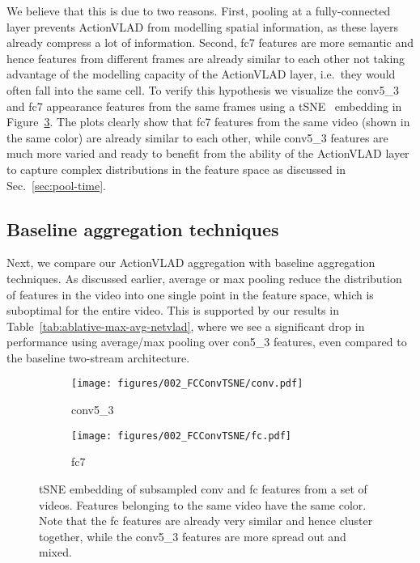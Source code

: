 \documentclass[10pt,twocolumn,letterpaper]{article}
\newcommand{\methodTag}[0]{ActionVLAD}
\begin{document}
We believe that this is due to two reasons. First, pooling
at a fully-connected layer prevents \methodTag{} 
from modelling spatial information, as these layers
already compress a lot of information.
Second, fc7 features are more semantic and hence features from different frames are already  similar to each other not taking advantage 
of the modelling capacity of the  \methodTag{} layer, i.e.\ they would often fall into the same cell.
To verify this hypothesis we visualize the conv5\_3 and fc7 appearance features from the same frames using a tSNE~\cite{tsne} embedding in Figure~\ref{fig:tsne_fc_conv5}.
The plots clearly show that fc7 features from the same video (shown in the same color) are already
similar to each other, while conv5\_3 features are much more varied and ready to benefit from the ability of the \methodTag{} layer to capture complex distributions in the feature space as discussed in Sec.~\ref{sec:pool-time}. 



\subsection{Baseline aggregation techniques}\label{sec:expts:whichAgg}

Next, we compare our ActionVLAD aggregation with baseline aggregation techniques. As discussed earlier, average or max pooling reduce the distribution of features in the video into one single point in the feature space, which is suboptimal for the entire video.  This is supported by our results in Table~\ref{tab:ablative-max-avg-netvlad}, where we see a significant drop in performance using average/max pooling over con5\_3 features, even compared to the baseline two-stream architecture.


\begin{figure}
    \centering
    \begin{subfigure}{0.49\linewidth} \centering
     \texttt{[image: figures/002\_FCConvTSNE/conv.pdf]}
     \caption*{conv5\_3}\label{fig:rgbflow:concat}
   \end{subfigure}\hfill
   \begin{subfigure}{0.49\linewidth} \centering
     \texttt{[image: figures/002\_FCConvTSNE/fc.pdf]}
     \caption*{fc7}\label{fig:rgbflow:concat}
   \end{subfigure}
       \caption{tSNE embedding of subsampled conv and fc features from a set of videos.
    Features belonging to the same video have the same color.
        Note that the fc features are already very similar and hence cluster together,
    while the conv5\_3 features are more spread out and mixed.}
    \label{fig:tsne_fc_conv5}
\end{figure}
\end{document}
